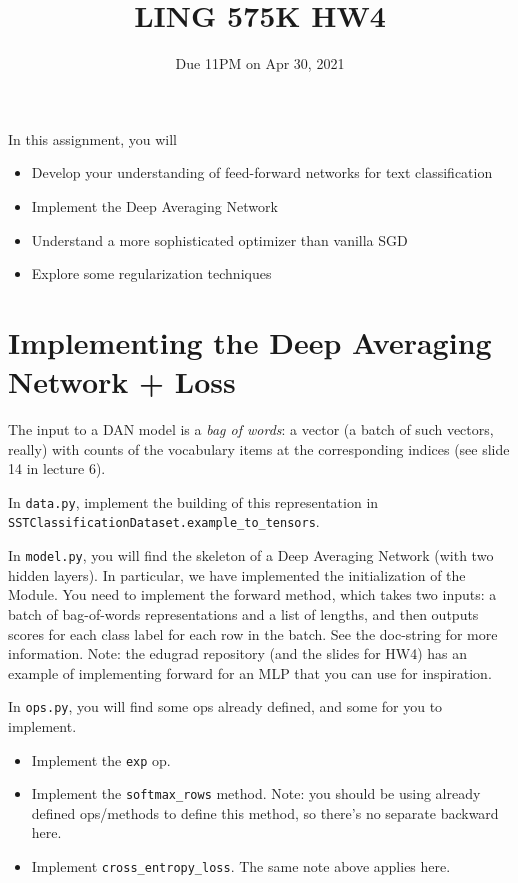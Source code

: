 \documentclass[11pt]{article}
\begin{document}
\title{LING 575K HW4}
\date{\vspace{-0.2in}Due 11PM on Apr 30, 2021}
\maketitle


\noindent In this assignment, you will 
\begin{itemize}
  \item Develop your understanding of feed-forward networks for text classification
  \item Implement the Deep Averaging Network
  \item Understand a more sophisticated optimizer than vanilla SGD
  \item Explore some regularization techniques
\end{itemize}


\section{Implementing the Deep Averaging Network + Loss}

  The input to a DAN model is a \emph{bag of words}: a vector (a batch of such vectors, really) with counts of the vocabulary items at the corresponding indices (see slide 14 in lecture 6).  

\noindent In \texttt{data.py}, implement the building of this representation in \texttt{SSTClassificationDataset.example\_to\_tensors}.


\vspace{2em}
  In \texttt{model.py}, you will find the skeleton of a Deep Averaging Network (with two hidden layers).  In particular, we have implemented the initialization of the Module.  You need to implement the forward method, which takes two inputs: a batch of bag-of-words representations and a list of lengths, and then outputs scores for each class label for each row in the batch.  See the doc-string for more information.  Note: the edugrad repository (and the slides for HW4) has an example of implementing forward for an MLP that you can use for inspiration.


\vspace{2em}
  In \texttt{ops.py}, you will find some ops already defined, and some for you to implement.
\begin{itemize}
  \item Implement the \texttt{exp} op.
  \item Implement the \texttt{softmax\_rows} method.  Note: you should be using already defined ops/methods to define this method, so there's no separate backward here.
  \item Implement \texttt{cross\_entropy\_loss}.  The same note above applies here.
\end{itemize}
\end{document}
